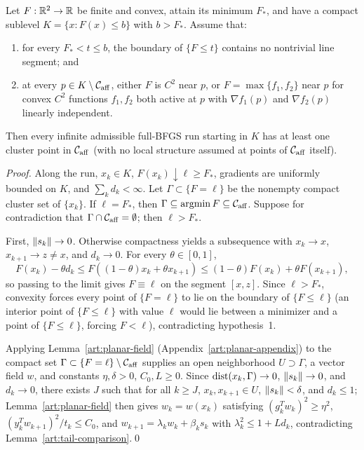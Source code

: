 \begin{theorem}\label{art:planar-cluster}
Let $F:\mathbb R^2\to\mathbb R$ be finite and convex, attain its minimum $F_*$, and have a
compact sublevel $K=\{x:F(x)\le b\}$ with $b>F_*$. Assume that:
\begin{enumerate}
\item for every $F_*<t\le b$, the boundary of $\{F\le t\}$ contains no
nontrivial line segment; and
\item at every $p\in K\setminus\mathcal C_{\rm aff}$, either $F$ is $C^2$ near
$p$, or $F=\max\{f_1,f_2\}$ near $p$ for convex $C^2$ functions $f_1,f_2$ both
active at $p$ with $\nabla f_1(p)$ and $\nabla f_2(p)$ linearly independent.
\end{enumerate}
Then every infinite admissible full-BFGS run starting in $K$ has at least one
cluster point in $\mathcal C_{\rm aff}$ (with no local structure assumed at
points of $\mathcal C_{\rm aff}$ itself).
\end{theorem}
\begin{proof}
Along the run, $x_k\in K$, $F(x_k)\downarrow\ell\ge F_*$, gradients are
uniformly bounded on $K$, and $\sum_kd_k<\infty$. Let $\Gamma\subset\{F=\ell\}$
be the nonempty compact cluster set of $\{x_k\}$. If $\ell=F_*$, then
$\Gamma\subseteq\operatorname{argmin} F\subseteq\mathcal C_{\rm aff}$. Suppose for
contradiction that $\Gamma\cap\mathcal C_{\rm aff}=\emptyset$; then $\ell>F_*$.

First, $\lVert s_k\rVert\to0$. Otherwise compactness yields a subsequence with
$x_k\to x$, $x_{k+1}\to z\ne x$, and $d_k\to0$. For every $\theta\in[0,1]$,
\[
 F(x_k)-\theta d_k
 \le F((1-\theta)x_k+\theta x_{k+1})
 \le(1-\theta)F(x_k)+\theta F(x_{k+1}),
\]
so passing to the limit gives $F\equiv\ell$ on the segment $[x,z]$. Since
$\ell>F_*$, convexity forces every point of $\{F=\ell\}$ to lie on the boundary
of $\{F\le\ell\}$ (an interior point of $\{F\le\ell\}$ with value $\ell$ would
lie between a minimizer and a point of $\{F\le\ell\}$, forcing $F<\ell$),
contradicting hypothesis~1.

Applying Lemma~\ref{art:planar-field} (Appendix~\ref{art:planar-appendix}) to
the compact set $\Gamma\subset\{F=\ell\}\setminus\mathcal C_{\rm aff}$ supplies
an open neighborhood $U\supset\Gamma$, a vector field $w$, and constants
$\eta,\delta>0$, $C_0,L\ge0$. Since $\operatorname{dist}(x_k,\Gamma)\to0$, $\lVert s_k\rVert\to0$,
and $d_k\to0$, there exists $J$ such that for all $k\ge J$, $x_k,x_{k+1}\in U$,
$\lVert s_k\rVert<\delta$, and $d_k\le1$; Lemma~\ref{art:planar-field} then gives
$w_k=w(x_k)$ satisfying $(g_k^Tw_k)^2\ge\eta^2$, $(y_k^Tw_{k+1})^2/t_k\le C_0$,
and $w_{k+1}=\lambda_kw_k+\beta_ks_k$ with $\lambda_k^2\le1+Ld_k$, contradicting
Lemma~\ref{art:tail-comparison}.\qed
\end{proof}


